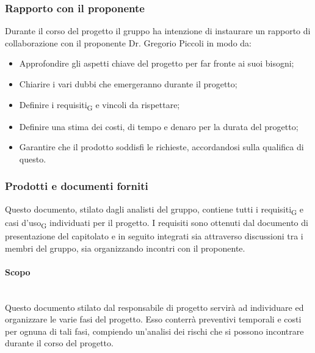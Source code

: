 \subsubsection{Rapporto con il proponente}
Durante il corso del progetto il gruppo ha intenzione di instaurare un rapporto di collaborazione con il proponente Dr. Gregorio Piccoli in modo da:
\begin{itemize}
	\item Approfondire gli aspetti chiave del progetto per far fronte ai suoi bisogni;
	\item Chiarire i vari dubbi che emergeranno durante il progetto;
	\item Definire i requisiti\textsubscript{G} e vincoli da rispettare;
	\item Definire una stima dei costi, di tempo e denaro per la durata del progetto;
	\item Garantire che il prodotto soddisfi le richieste, accordandosi sulla qualifica di questo.
\end{itemize} 

\subsubsection{Prodotti e documenti forniti}
Questo documento, stilato dagli analisti del gruppo, contiene tutti i requisiti\textsubscript{G} e casi d'uso\textsubscript{G} individuati per il progetto. I requisiti sono ottenuti dal documento di presentazione del capitolato e in seguito integrati sia attraverso discussioni tra i membri del gruppo, sia organizzando incontri con il proponente. 
\paragraph {Scopo}\mbox{}\\
Questo documento stilato dal responsabile di progetto servirà ad individuare ed organizzare le varie fasi del progetto. Esso conterrà preventivi temporali e costi per ognuna di tali fasi, compiendo un'analisi dei rischi che si possono incontrare durante il corso del progetto.
